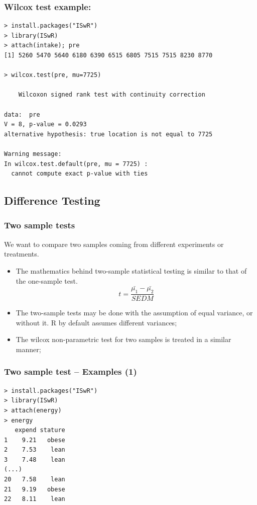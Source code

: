 \documentclass[10pt]{beamer}
\begin{document}
\begin{frame}
  \frametitle{Wilcox test example:}
{\small
\begin{verbatim}
> install.packages("ISwR")
> library(ISwR)
> attach(intake); pre
[1] 5260 5470 5640 6180 6390 6515 6805 7515 7515 8230 8770

> wilcox.test(pre, mu=7725)

    Wilcoxon signed rank test with continuity correction

data:  pre 
V = 8, p-value = 0.0293
alternative hypothesis: true location is not equal to 7725 

Warning message:
In wilcox.test.default(pre, mu = 7725) :
  cannot compute exact p-value with ties
\end{verbatim}
}
\end{frame}

\subsection{Difference Testing}

\begin{frame}
  \frametitle{Two sample tests}
  \begin{block}{}
    We want to compare two samples coming from different experiments or treatments.
  \end{block}
  \begin{itemize}
  \item The mathematics behind two-sample statistical testing is
    similar to that of the one-sample test.
    \begin{equation*}
      t = \frac{\bar{\mu_1} - \bar{\mu_2}}{SEDM}
    \end{equation*}
  \item The two-sample tests may be done with the assumption of equal
    variance, or without it. R by default assumes different variances;
  \item The wilcox non-parametric test for two samples is treated in a
    similar manner;
  \end{itemize}
\end{frame}

\begin{frame}
  \frametitle{Two sample test -- Examples (1)}
\begin{verbatim}
> install.packages("ISwR")
> library(ISwR)
> attach(energy)
> energy
   expend stature
1    9.21   obese
2    7.53    lean
3    7.48    lean
(...)
20   7.58    lean
21   9.19   obese
22   8.11    lean
\end{verbatim}
\end{frame}
\end{document}
